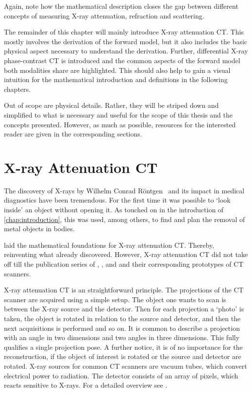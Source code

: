 Again, note how the mathematical description closes the gap between different concepts of
measuring X-ray attenuation, refraction and scattering.

The remainder of this chapter will mainly introduce X-ray attenuation CT\@. This mostly involves the
derivation of the forward model, but it also includes the basic physical aspect necessary to
understand the derivation. Further, differential X-ray phase-contrast CT is introduced and the
common aspects of the forward model both modalities share are highlighted. This should also help to
gain a visual intuition for the mathematical introduction and definitions in the following chapters.

Out of scope are physical details. Rather, they will be striped down and simplified to what is
necessary and useful for the scope of this thesis and the concepts presented. However, as much as
possible, resources for the interested reader are given in the corresponding sections.

\section{X-ray Attenuation CT}\label{sec:xray_attenuation_ct}

The discovery of X-rays by Wilhelm Conrad Röntgen~\cite{rontgen_uber_1895,rontgen_new_1896} and its
impact in medical diagnostics have been tremendous. For the first time it was possible to `look
inside' an object without opening it. As touched on in the introduction of
\autoref{chap:introduction}, this was used, among others, to find and plan the removal of metal
objects in bodies.

\textcite{cormack_representation_1963} laid the mathematical foundations for X-ray attenuation CT\@.
Thereby, reinventing what \citeauthor*{radon_uber_1917} already discovered. However, X-ray
attenuation CT did not take off till the publication series of
\textcite{hounsfield_computerized_1973}, \textcite{ambrose_computerized_1973}, and
\textcite{perry_computerized_1973} and their corresponding prototypes of CT scanners.

X-ray attenuation CT is an straightforward principle. The projections of the CT scanner are acquired
using a simple setup. The object one wants to scan is between the X-ray source and the detector.
Then for each projection a `photo' is taken, the object is rotated in relation to the source and
detector, and then the next acquisitions is performed and so on. It is common to describe a
projection with an angle in two dimensions and two angles in three dimensions. This fully qualifies
a single projection pose. A further notice, it is of no importance for the reconstruction, if the
object of interest is rotated or the source and detector are rotated. X-ray sources for common CT
scanners are vacuum tubes, which convert electrical power to radiation. The detector consists of an
array of pixels, which reacts sensitive to X-rays. For a detailed overview see
\textcite{buzug_computed_2008}.

